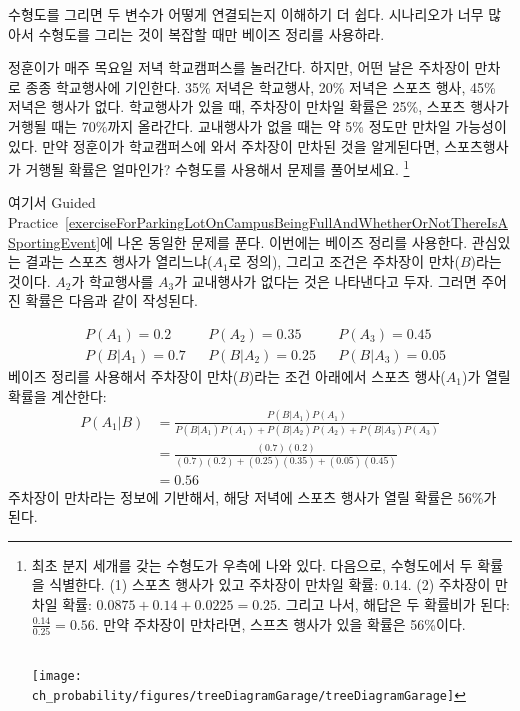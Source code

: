 \begin{tipBox}{
수형도를 그리면 두 변수가 어떻게 연결되는지 이해하기 더 쉽다. 시나리오가 너무 많아서 수형도를 그리는 것이 복잡할 때만 베이즈 정리를 사용하라.}
\end{tipBox}

\textC{\newpage}

\begin{exercise} \label{exerciseForParkingLotOnCampusBeingFullAndWhetherOrNotThereIsASportingEvent}
정훈이가 매주 목요일 저녁 학교캠퍼스를 놀러간다. 하지만, 어떤 날은 주차장이 만차로 종종 학교행사에 기인한다. 35\% 저녁은 학교행사, 20\% 저녁은 스포츠 행사, 45\% 저녁은 행사가 없다. 학교행사가 있을 때, 주차장이 만차일 확률은 25\%, 스포츠 행사가 거행될 때는 70\%까지 올라간다. 교내행사가 없을 때는 약 5\% 정도만 만차일 가능성이 있다. 만약 정훈이가 학교캠퍼스에 와서 주차장이 만차된 것을 알게된다면, 스포츠행사가 거행될 확률은 얼마인가? 수형도를 사용해서 문제를 풀어보세요. 
\footnote{\begin{minipage}[t]{0.47\linewidth} 최초 분지 세개를 갖는 수형도가 우측에 나와 있다. 다음으로, 수형도에서 두 확률을 식별한다. (1) 스포츠 행사가 있고 주차장이 만차일 확률: 0.14. (2) 주차장이 만차일 확률: $0.0875 + 0.14 + 0.0225 = 0.25$. 그리고 나서, 해답은 두 확률비가 된다: $\frac{0.14}{0.25} = 0.56$. 만약 주차장이 만차라면, 스프츠 행사가 있을 확률은 56\%이다. \vspace{0.1mm} \\\ 
\end{minipage}
\begin{minipage}[c]{0.5\linewidth}
\texttt{[image: ch\_probability/figures/treeDiagramGarage/treeDiagramGarage]}\vspace{-30mm}
\end{minipage}}
\end{exercise}

\begin{example}{여기서 Guided Practice~\ref{exerciseForParkingLotOnCampusBeingFullAndWhetherOrNotThereIsASportingEvent}에 나온 동일한 문제를 푼다. 이번에는 베이즈 정리를 사용한다.}
관심있는 결과는 스포츠 행사가 열리느냐($A_1$로 정의), 그리고 조건은 주차장이 만차($B$)라는 것이다. 
$A_2$가 학교행사를 $A_3$가 교내행사가 없다는 것은 나타낸다고 두자. 그러면 주어진 확률은 다음과 같이 작성된다.

\begin{align*}
&P(A_1) = 0.2 &&P(A_2) = 0.35 &&P(A_3) = 0.45 \\
&P(B | A_1) = 0.7 &&P(B | A_2) = 0.25 &&P(B | A_3) = 0.05
\end{align*}
베이즈 정리를 사용해서 주차장이 만차($B$)라는 조건 아래에서 스포츠 행사($A_1$)가 열릴 확률을 계산한다:
\begin{align*}
P(A_1 | B) &= \frac{P(B | A_1) P(A_1)}{P(B | A_1) P(A_1) + P(B | A_2) P(A_2) + P(B | A_3) P(A_3)} \\
		&= \frac{(0.7)(0.2)}{(0.7)(0.2) + (0.25)(0.35) + (0.05)(0.45)} \\
		&= 0.56 
\end{align*}
주차장이 만차라는 정보에 기반해서, 해당 저녁에 스포츠 행사가 열릴 확률은 56\%가 된다.
\end{example}


